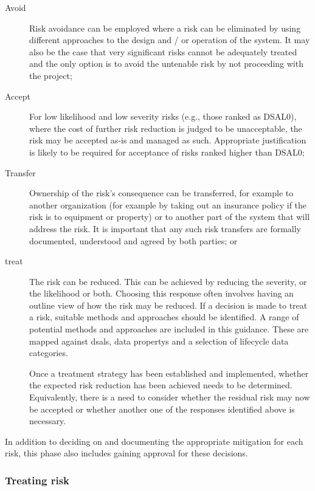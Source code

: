 \begin{description}
  \item[Avoid]Risk avoidance can be employed where a risk can be eliminated by using different approaches to the design and / or operation of the system. It may also be the case that very significant risks cannot be adequately treated and the only option is to avoid the untenable risk by not proceeding with the project;
  \item[Accept]For low likelihood and low severity risks (e.g., those ranked as DSAL0), where the cost of further risk reduction is judged to be unacceptable, the risk may be accepted as-is and managed as such. Appropriate justification is likely to be required for acceptance of risks ranked higher than DSAL0;
  \item[Transfer]Ownership of the risk's consequence can be transferred, for example to another organization (for example by taking out an insurance policy if the risk is to equipment or property) or to another part of the system that will address the risk. It is important that any such risk transfers are formally documented, understood and agreed by both parties; or
  \item[\Gls{treat}]The risk can be reduced. This can be achieved by reducing the severity, or the likelihood or both. Choosing this \gls{response} often involves having an outline view of how the risk may be reduced. If a decision is made to \gls{treat} a risk, suitable methods and approaches should be identified. A range of potential methods and approaches are included in this guidance. These are mapped against \glspl{dsal}, \glspl{data property} and a selection of lifecycle data categories.
  
  Once a \gls{treatment} strategy has been established and implemented, whether the expected risk reduction has been achieved needs to be determined. Equivalently, there is a need to consider whether the residual risk may now be accepted or whether another one of the \glspl{response} identified above is necessary.
  
\end{description}

In addition to deciding on and documenting the appropriate mitigation for each risk, this phase also includes gaining approval for these decisions.
\subsubsection{Treating risk}

